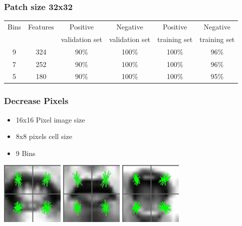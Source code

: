 \documentclass[serif,14pt]{beamer}
\begin{document}
\begin{frame}
  \frametitle{Patch size 32x32}
  
\begin{scriptsize}
 
\begin{tabular}{| c | c | c | c | c | c |}
\hline
Bins & Features &  Positive  & Negative  & Positive  & Negative \\

& & validation set & validation set & training set & training set \\

\hline
9 & 324 & 90\% & 100\% & 100\% & 96\% \\
7& 252 & 90\% & 100\% & 100\% & 96\% \\
5& 180 & 90\% & 100\% & 100\% & 95\% \\
\hline
\end{tabular}

\end{scriptsize}

\end{frame}
\begin{frame}
  \frametitle{Decrease Pixels}
    \begin{itemize}
		\item 16x16 Pixel image size

				\item 8x8 pixels cell size

				\item 9 Bins
	\end{itemize}
    \vspace{1.0cm}
\includegraphics[width=3cm,height=3cm]{hog16.jpg}
    \hspace{0.7cm}
\includegraphics[width=3cm,height=3cm]{hog16b.jpg}
    \hspace{0.7cm}
\includegraphics[width=3cm,height=3cm]{images/positiveTrain_25_16.jpg}

\end{frame}
\end{document}
